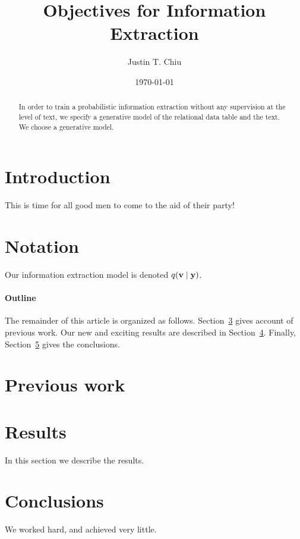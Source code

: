 \documentclass[12pt]{article}
\title{Objectives for Information Extraction}
\author{
Justin T. Chiu
}
\date{\today}
\begin{document}
\maketitle

\begin{abstract}
In order to train a probabilistic information extraction without any
supervision at the level of text, we specify a generative model of
the relational data table and the text.
We choose a generative model.
\end{abstract}

\section{Introduction}
This is time for all good men to come to the aid of their party!

\section{Notation}
Our information extraction model is denoted $q(\mathbf{v} \mid \mathbf{y})$.

\paragraph{Outline}
The remainder of this article is organized as follows.
Section~\ref{previous work} gives account of previous work.
Our new and exciting results are described in Section~\ref{results}.
Finally, Section~\ref{conclusions} gives the conclusions.

\section{Previous work}\label{previous work}

\section{Results}\label{results}
In this section we describe the results.

\section{Conclusions}\label{conclusions}
We worked hard, and achieved very little.

%
%
\end{document}
